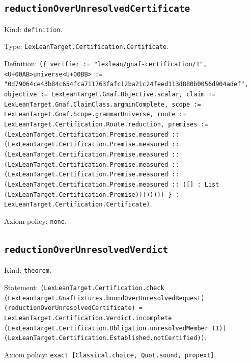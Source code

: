 \documentclass[11pt]{article}
\begin{document}
\subsection*{\texttt{reductionOverUnresolvedCertificate}}
\noindent Kind: \texttt{definition}.\par
\noindent Type: \texttt{LexLeanTarget.Certification.Certificate}.\par
\noindent Definition: \texttt{(\{ verifier := "lexlean/gnaf-certification/1", <U+00AB>universe<U+00BB> := "0d79064ce43b84c654fca711763fafc12ba21c24feed113d880b0056d904adef", objective := LexLeanTarget.Gnaf.Objective.scalar, claim := LexLeanTarget.Gnaf.ClaimClass.argminComplete, scope := LexLeanTarget.Gnaf.Scope.grammarUniverse, route := LexLeanTarget.Certification.Route.reduction, premises := (LexLeanTarget.Certification.Premise.measured :: (LexLeanTarget.Certification.Premise.measured :: (LexLeanTarget.Certification.Premise.measured :: (LexLeanTarget.Certification.Premise.measured :: (LexLeanTarget.Certification.Premise.measured :: (LexLeanTarget.Certification.Premise.measured :: ([] : List (LexLeanTarget.Certification.Premise)))))))) \} : LexLeanTarget.Certification.Certificate)}.\par
\noindent Axiom policy: \texttt{none}.\par
\subsection*{\texttt{reductionOverUnresolvedVerdict}}
\noindent Kind: \texttt{theorem}.\par
\noindent Statement: \texttt{(LexLeanTarget.Certification.check (LexLeanTarget.GnafFixtures.boundOverUnresolvedRequest) (reductionOverUnresolvedCertificate) = LexLeanTarget.Certification.Verdict.incomplete (LexLeanTarget.Certification.Obligation.unresolvedMember (1)) (LexLeanTarget.Certification.Established.notCertified))}.\par
\noindent Axiom policy: \texttt{exact [Classical.choice, Quot.sound, propext]}.\par
\end{document}
